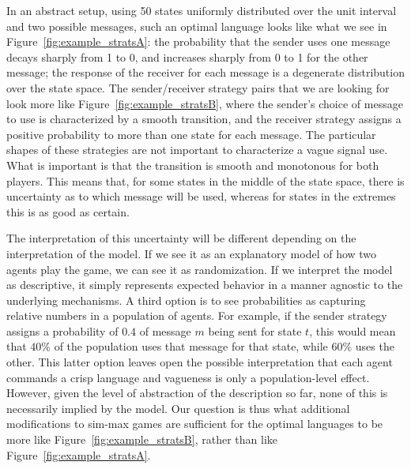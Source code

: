 \documentclass[a4paper]{article}
\begin{document}
In an abstract setup, using 50 states uniformly distributed over the unit interval and two possible messages, such an optimal language looks like what we see in Figure~\ref{fig:example_stratsA}: the probability that the sender uses one message decays sharply from 1 to 0, and increases sharply from 0 to 1 for the other message; the response of the receiver for each message is a degenerate distribution over the state space.
The sender/receiver strategy pairs that we are looking for look more like Figure~\ref{fig:example_stratsB}, where the sender's choice of message to use is characterized by a smooth transition, and the receiver strategy assigns a positive probability to more than one state for each message.
The particular shapes of these strategies are not important to characterize a vague signal use.
What is important is that the transition is smooth and monotonous for both players.
This means that, for some states in the middle of the state space, there is uncertainty as to which message will be used, whereas for states in the extremes this is as good as certain.

The interpretation of this uncertainty will be different depending on the interpretation of the model.
If we see it as an explanatory model of how two agents play the game, we can see it as randomization.
If we interpret the model as descriptive, it simply represents expected behavior in a manner agnostic to the underlying mechanisms.
A third option is to see probabilities as capturing relative numbers in a population of agents.
For example, if the sender strategy assigns a probability of $0.4$ of message $m$ being sent for state $t$, this would mean that $40\%$ of the population uses that message for that state, while $60\%$ uses the other.
This latter option leaves open the possible interpretation that each agent commands a crisp language and vagueness is only a population-level effect.
However, given the level of abstraction of the description so far, none of this is necessarily implied by the model.
Our question is thus what additional modifications to sim-max games are sufficient for the optimal languages to be more like Figure~\ref{fig:example_stratsB}, rather than like Figure~\ref{fig:example_stratsA}.
\end{document}
